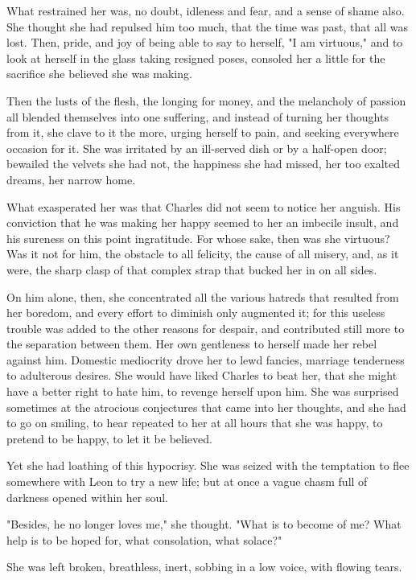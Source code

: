 \documentclass{tufte-book}
\begin{document}
What restrained her was, no doubt, idleness and fear, and a sense of
shame also. She thought she had repulsed him too much, that the time was
past, that all was lost. Then, pride, and joy of being able to say to
herself, "I am virtuous," and to look at herself in the glass taking
resigned poses, consoled her a little for the sacrifice she believed she
was making.

Then the lusts of the flesh, the longing for money, and the melancholy
of passion all blended themselves into one suffering, and instead of
turning her thoughts from it, she clave to it the more, urging herself
to pain, and seeking everywhere occasion for it. She was irritated by
an ill-served dish or by a half-open door; bewailed the velvets she had
not, the happiness she had missed, her too exalted dreams, her narrow
home.

What exasperated her was that Charles did not seem to notice her
anguish. His conviction that he was making her happy seemed to her an
imbecile insult, and his sureness on this point ingratitude. For whose
sake, then was she virtuous? Was it not for him, the obstacle to all
felicity, the cause of all misery, and, as it were, the sharp clasp of
that complex strap that bucked her in on all sides.

On him alone, then, she concentrated all the various hatreds that
resulted from her boredom, and every effort to diminish only augmented
it; for this useless trouble was added to the other reasons for despair,
and contributed still more to the separation between them. Her own
gentleness to herself made her rebel against him. Domestic mediocrity
drove her to lewd fancies, marriage tenderness to adulterous desires.
She would have liked Charles to beat her, that she might have a better
right to hate him, to revenge herself upon him. She was surprised
sometimes at the atrocious conjectures that came into her thoughts, and
she had to go on smiling, to hear repeated to her at all hours that she
was happy, to pretend to be happy, to let it be believed.

Yet she had loathing of this hypocrisy. She was seized with the
temptation to flee somewhere with Leon to try a new life; but at once a
vague chasm full of darkness opened within her soul.

"Besides, he no longer loves me," she thought. "What is to become of me?
What help is to be hoped for, what consolation, what solace?"

She was left broken, breathless, inert, sobbing in a low voice, with
flowing tears.
\end{document}
